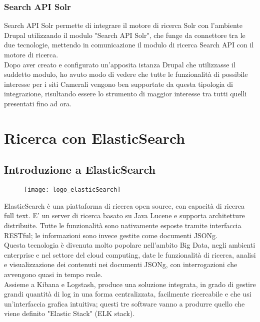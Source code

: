 			\subsubsection{Search API Solr}
			Search API Solr permette di integrare il motore di ricerca \gls{Solr} con l'ambiente \gls{Drupal} utilizzando il modulo "Search API Solr", che funge da connettore tra le due tecnologie, mettendo in comunicazione il modulo di ricerca \gls{Search API} con il motore di ricerca. \\
			Dopo aver creato e configurato un'apposita istanza \gls{Drupal} che utilizzasse il suddetto modulo, ho avuto modo di vedere che tutte le funzionalità di possibile interesse per i siti Camerali vengono ben supportate da questa tipologia di integrazione, risultando essere lo strumento di maggior interesse tra tutti quelli presentati fino ad ora.
	
	\section{Ricerca con ElasticSearch}
	
		\subsection{Introduzione a ElasticSearch}
		
		\begin{figure}[htbp]
			\begin{center}
				\texttt{[image: logo\_elasticSearch]}
			\end{center}
		\end{figure}
		
		\gls{ElasticSearch} è una piattaforma di ricerca \gls{open source}, con capacità di ricerca full text. E' un server di ricerca basato su \gls{Java Lucene} e supporta architetture distribuite. Tutte le funzionalità sono nativamente esposte tramite interfaccia \gls{RESTful}; le informazioni sono invece gestite come documenti \gls{JSONg}. \\
		Questa tecnologia è divenuta molto popolare nell'ambito Big Data, negli ambienti enterprise e nel settore del cloud computing, date le funzionalità di ricerca, analisi e visualizzazione dei contenuti nei documenti \gls{JSONg}, con interrogazioni che avvengono quasi in tempo reale. \\
		Assieme a \gls{Kibana} e \gls{Logstash}, produce una soluzione integrata, in grado di gestire grandi quantità di log in una forma centralizzata, facilmente ricercabile e che usi un'interfaccia grafica intuitiva; questi tre software vanno a produrre quello che viene definito "Elastic Stack" (ELK stack).

